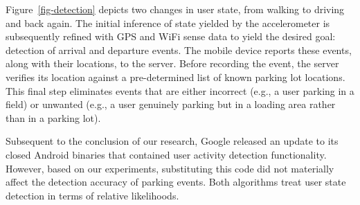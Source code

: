 Figure~\ref{fig-detection} depicts two changes in user state, from walking to
driving and back again.  The initial inference of state yielded by the
accelerometer is subsequently refined with GPS and WiFi sense data to
yield the desired goal:  detection of arrival and departure events.  The mobile
device reports these events, along with their locations, to the server.  Before
recording the event, the server verifies its location against a pre-determined
list of known parking lot locations.  This final step eliminates events that
are either incorrect (e.g., a user parking in a field) or unwanted (e.g., a
user genuinely parking but in a loading area rather than in a parking lot).

Subsequent to the conclusion of our research, Google released an update to its
closed Android binaries that contained user activity detection functionality.
However, based on our experiments, substituting this
code did not materially affect the detection accuracy of parking 
events.  Both algorithms treat user state detection in terms of relative
likelihoods.~\cite{recognition-confidence}  

